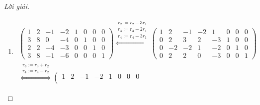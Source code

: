 \documentclass[class=nhvh-linear-algebra,crop=false]{standalone}
\begin{document}
\begin{proof}[Lời giải]
\begin{enumerate}[label = (\alph*)]
\begin{gather*}
			      \right)
		      \end{gather*}
		      \par Vậy
		      \[
			      \begin{pmatrix}
				      0 & 1 & 3 \\
				      2 & 3 & 5 \\
				      3 & 6 & 7
			      \end{pmatrix}^{-1}
			      =
			      \begin{pmatrix}
				      \frac{-9}{10} & \frac{11}{10} & \frac{-2}{5} \\
				      \frac{1}{10}  & \frac{-9}{10} & \frac{3}{5}  \\
				      \frac{3}{10}  & \frac{3}{10}  & \frac{-1}{5}
			      \end{pmatrix}.
		      \]
		      \endgroup{}
		\item
		      \begingroup{}
		      \allowdisplaybreaks{}
		      \begin{gather*}
			      \left(\begin{array}{cccc|cccc}
					      1 & 2 & -1 & -2 & 1 & 0 & 0 & 0 \\
					      3 & 8 & 0  & -4 & 0 & 1 & 0 & 0 \\
					      2 & 2 & -4 & -3 & 0 & 0 & 1 & 0 \\
					      3 & 8 & -1 & -6 & 0 & 0 & 0 & 1
				      \end{array}
			      \right)
			      \stackrel{
				      \substack{
					      r_{2}:= r_{2} {-} 3r_{1} \\
					      r_{3}:= r_{3} {-} 2r_{1} \\
					      r_{4}:= r_{4} {-} 3r_{1}
				      }
			      }{\Longleftrightarrow}
			      \left(\begin{array}{cccc|cccc}
					      1 & 2  & -1 & -2 & 1  & 0 & 0 & 0 \\
					      0 & 2  & 3  & 2  & -3 & 1 & 0 & 0 \\
					      0 & -2 & -2 & 1  & -2 & 0 & 1 & 0 \\
					      0 & 2  & 2  & 0  & -3 & 0 & 0 & 1
				      \end{array}
			      \right) \\
			      \stackrel{
				      \substack{
					      r_{3}:= r_{3} + r_{2} \\
					      r_{4}:= r_{4} {-} r_{2}
				      }
			      }{\Longleftrightarrow}
			      \left(\begin{array}{cccc|cccc}
					      1 & 2 & -1 & -2 & 1  & 0  & 0 & 0 \\

\end{array}
\end{gather*}
\end{enumerate}
\end{proof}
\end{document}
